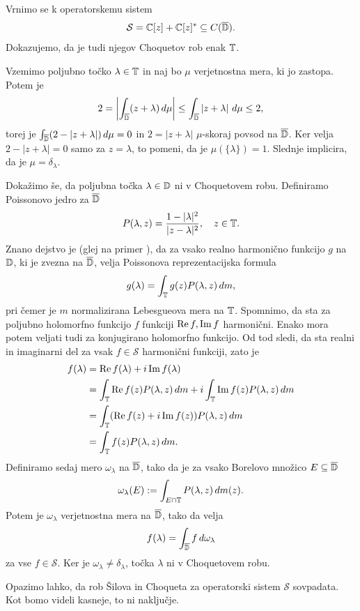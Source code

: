 \begin{zgled}
    Vrnimo se k operatorskemu sistem
    $$\mathcal{S} = \mathbb C [z] + \mathbb C[z]^* \subseteq C(\overline{\mathbb D}).$$
    Dokazujemo, da je tudi njegov Choquetov rob enak $\mathbb T$.

    Vzemimo poljubno točko $\lambda \in \mathbb T$ in naj bo $\mu$ verjetnostna mera, ki jo zastopa.
    Potem je $$2 = \left| \int_{\overline{\mathbb D}} (z + \lambda)\, d\mu \right| \leq \int_{\overline{\mathbb D}} \left| z + \lambda\right| \, d\mu \leq 2,$$
    torej je $\int_{\overline{\mathbb D}} (2 - |z + \lambda|)\, d\mu = 0$ in $2 = | z + \lambda|$ $\mu$-skoraj povsod na $\overline{\mathbb D}$.
    Ker velja $2 - |z + \lambda| = 0$ samo za $z = \lambda$, to pomeni, da je $\mu (\{\lambda\}) = 1$.
    Slednje implicira, da je $\mu = \delta_\lambda$.

    Dokažimo še, da poljubna točka $\lambda \in {\mathbb D}$ ni v Choquetovem robu.    
    Definiramo Poissonovo jedro za $\overline{\mathbb D}$
    $$P(\lambda, z) = \frac{1 - |\lambda|^2}{|z - \lambda|^2},\quad z \in \mathbb T.$$
    Znano dejstvo je (glej na primer \cite[Theorem 15, str. 41]{evans2010}), da za vsako realno harmonično funkcijo $g$ na $\mathbb D$, ki je zvezna na $\overline{\mathbb D}$, 
    velja Poissonova reprezentacijska formula
    $$g(\lambda) = \int_{\mathbb T} g(z) P(\lambda, z)\, dm ,$$
    pri čemer je $m$ normalizirana Lebesgueova mera na $\mathbb T$. 
    Spomnimo, da sta za poljubno holomorfno funkcijo $f$ funkciji $\operatorname{Re} f, \operatorname{Im} f$ harmonični.
    Enako mora potem veljati tudi za konjugirano holomorfno funkcijo.
    Od tod sledi, da sta realni in imaginarni del za vsak $f \in \mathcal{S}$
    harmonični funkciji,
    zato je
    \begin{align*}
        f(\lambda) &= \operatorname{Re} f(\lambda) + i \operatorname{Im} f(\lambda) \\
        &= \int_{\mathbb T} \operatorname{Re} f(z) P(\lambda, z)\, dm + i \int_{\mathbb T} \operatorname{Im} f(z) P(\lambda, z)\, dm \\ 
        &= \int_{\mathbb T} (\operatorname{Re} f(z) + i \operatorname{Im} f(z)) P(\lambda, z)\, dm \\ 
        &= \int_{\mathbb T} f(z) P(\lambda, z)\, dm.
    \end{align*}
    Definiramo sedaj mero $\omega_\lambda$ na $\overline{\mathbb D}$,
    tako da je za vsako Borelovo množico $E \subseteq \overline{\mathbb D}$ 
    $$\omega_\lambda (E) := \int_{E \cap \mathbb T} P(\lambda, z)\, dm (z).$$ Potem je $\omega_\lambda$
    verjetnostna mera na $\overline{\mathbb D}$, tako da velja 
    $$f(\lambda) = \int_{\overline{\mathbb D}} f\, d\omega_\lambda$$
    za vse $f \in \mathcal{S}$. Ker je $\omega_\lambda \neq \delta_\lambda$,
    točka $\lambda$ ni v Choquetovem robu.

    Opazimo lahko, da rob Šilova in Choqueta za operatorski sistem $\mathcal{S}$ sovpadata. 
    Kot bomo videli kasneje, to ni naključje.
\end{zgled}

